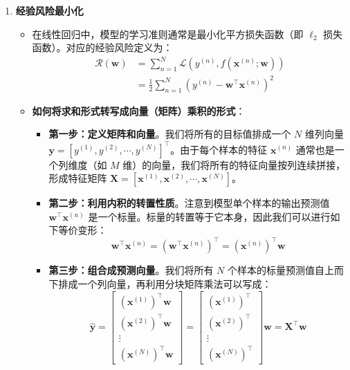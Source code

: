 \documentclass{article}
\theoremstyle{remark}
\theoremstyle{definition}
\theoremstyle{plain}
\numberwithin {equation}{section}
\numberwithin{assumption}{section}
\begin{document}
\begin{enumerate}
    \item \textbf{经验风险最小化}
    \begin{itemize}
        \item 在线性回归中，模型的学习准则通常是最小化平方损失函数（即 $\ell_2$ 损失函数）。对应的经验风险定义为：
        \begin{align*}
        \mathcal{R}(\boldsymbol{w}) & =\sum_{n=1}^N \mathcal{L}\left(y^{(n)}, f\left(\boldsymbol{x}^{(n)} ; \boldsymbol{w}\right)\right) \\
        & =\frac{1}{2} \sum_{n=1}^N\left(y^{(n)}-\boldsymbol{w}^{\top} \boldsymbol{x}^{(n)}\right)^2 
        \end{align*}
        
        \item \textbf{如何将求和形式转写成向量（矩阵）乘积的形式}：
        \begin{itemize}
            \item \textbf{第一步：定义矩阵和向量}。我们将所有的目标值排成一个 $N$ 维列向量 $\boldsymbol{y} = \left[y^{(1)}, y^{(2)}, \cdots, y^{(N)}\right]^{\top}$。由于每个样本的特征 $\boldsymbol{x}^{(n)}$ 通常也是一个列维度（如 $M$ 维）的向量，我们将所有的特征向量按列连续拼接，形成特征矩阵 $\boldsymbol{X} = \left[\boldsymbol{x}^{(1)}, \boldsymbol{x}^{(2)}, \cdots, \boldsymbol{x}^{(N)}\right]$。
            \item \textbf{第二步：利用内积的转置性质}。注意到模型单个样本的输出预测值 $\boldsymbol{w}^{\top} \boldsymbol{x}^{(n)}$ 是一个标量。标量的转置等于它本身，因此我们可以进行如下等价变形：
            \begin{equation*}
                \boldsymbol{w}^{\top} \boldsymbol{x}^{(n)} = \left(\boldsymbol{w}^{\top} \boldsymbol{x}^{(n)}\right)^{\top} = \left(\boldsymbol{x}^{(n)}\right)^{\top} \boldsymbol{w}
            \end{equation*}
            \item \textbf{第三步：组合成预测向量}。我们将所有 $N$ 个样本的标量预测值自上而下排成一个列向量，再利用分块矩阵乘法可以写成：
            \begin{equation*}
                \hat{\boldsymbol{y}} = \begin{bmatrix} \left(\boldsymbol{x}^{(1)}\right)^{\top} \boldsymbol{w} \\ \left(\boldsymbol{x}^{(2)}\right)^{\top} \boldsymbol{w} \\ \vdots \\ \left(\boldsymbol{x}^{(N)}\right)^{\top} \boldsymbol{w} \end{bmatrix} = \begin{bmatrix} \left(\boldsymbol{x}^{(1)}\right)^{\top} \\ \left(\boldsymbol{x}^{(2)}\right)^{\top} \\ \vdots \\ \left(\boldsymbol{x}^{(N)}\right)^{\top} \end{bmatrix} \boldsymbol{w} = \boldsymbol{X}^{\top} \boldsymbol{w}

\end{equation*}
\end{itemize}
\end{itemize}
\end{enumerate}
\end{document}
